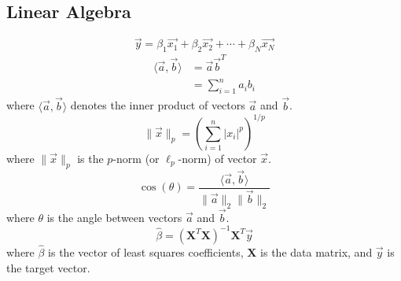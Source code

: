 \subsection{Linear Algebra}
\begin{equation}
    \vec{y} = \beta_1 \vec{x_1} + \beta_2 \vec{x_2} + \cdots + \beta_N \vec{x_N}
\end{equation}
\begin{align}
    \langle \vec{a}, \vec{b} \rangle & = \vec{a}\vec{b}^{T}     \\
                                     & = \sum_{i=1}^{n} a_i b_i
\end{align}
where $\langle \vec{a}, \vec{b} \rangle$ denotes the inner product of vectors $\vec{a}$ and $\vec{b}$.
\begin{equation}
    \|\vec{x}\|_p = \left( \sum_{i=1}^{n} |x_i|^p \right)^{1/p}
\end{equation}
where $\|\vec{x}\|_p$ is the $p$-norm (or $\ell_p$-norm) of vector $\vec{x}$.
\begin{equation}
    \cos(\theta) = \frac{\langle \vec{a}, \vec{b} \rangle}{\|\vec{a}\|_2 \|\vec{b}\|_2}
\end{equation}
where $\theta$ is the angle between vectors $\vec{a}$ and $\vec{b}$.
\begin{equation}
    \hat{\beta} = (\mathbf{X}^T \mathbf{X})^{-1} \mathbf{X}^T \vec{y}
\end{equation}
where $\hat{\beta}$ is the vector of least squares coefficients, $\mathbf{X}$ is the data matrix, and $\vec{y}$ is the target vector.
